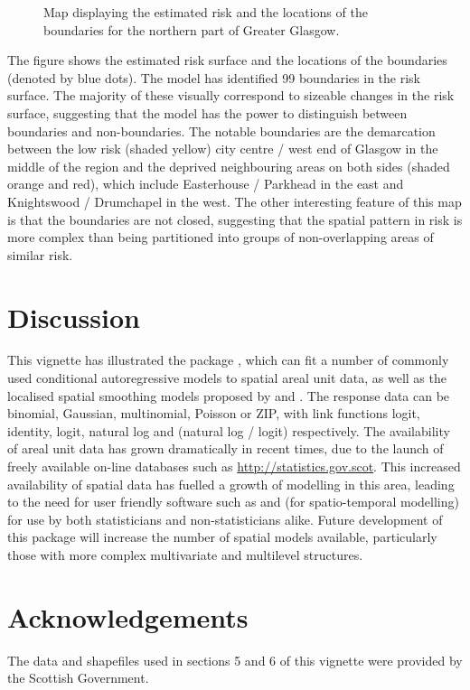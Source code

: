 \documentclass[article,shortnames,nojss]{jss}
\begin{document}
\begin{figure}
\begin{center}
\end{center}
\vspace{-1cm}\caption{Map displaying the estimated risk and the locations of the boundaries for the northern part of Greater Glasgow.}\label{figure_boundary}
\end{figure}


The figure shows the estimated risk surface and the locations of the boundaries (denoted by blue dots).  The model has identified 99 boundaries in the risk surface. The majority of these visually correspond to sizeable changes in the risk surface, suggesting that the model has the power to distinguish between boundaries and non-boundaries. The notable boundaries are the demarcation between the low risk (shaded yellow) city centre / west end of Glasgow in the middle of the region and the deprived neighbouring areas on both sides (shaded orange and red), which include Easterhouse / Parkhead in the east and Knightswood / Drumchapel in the west. The other interesting feature of this map is that the boundaries are not closed, suggesting that the spatial pattern in risk is more complex than being partitioned into groups of non-overlapping areas of similar risk.


\section{Discussion}
This vignette has illustrated the  package , which can fit a number of commonly used  conditional autoregressive models to spatial areal unit data, as well as the localised spatial smoothing models proposed by \cite{lee2012} and \cite{lee2015}. The response data can be binomial, Gaussian, multinomial, Poisson or ZIP, with link functions logit, identity, logit, natural log and (natural log / logit) respectively. The availability of areal unit data has grown dramatically in recent times, due to the launch of freely available on-line databases such as \url{http://statistics.gov.scot}. This increased availability of spatial data has fuelled a growth of modelling in this area, leading to the need for user friendly software such as  and  (for spatio-temporal modelling) for use by both statisticians and non-statisticians alike. Future development of this package will increase the number of spatial models available, particularly those with more complex multivariate and multilevel structures.

\section*{Acknowledgements}
The data and shapefiles used in sections 5 and 6 of this vignette were provided by the Scottish Government.



\end{document}
